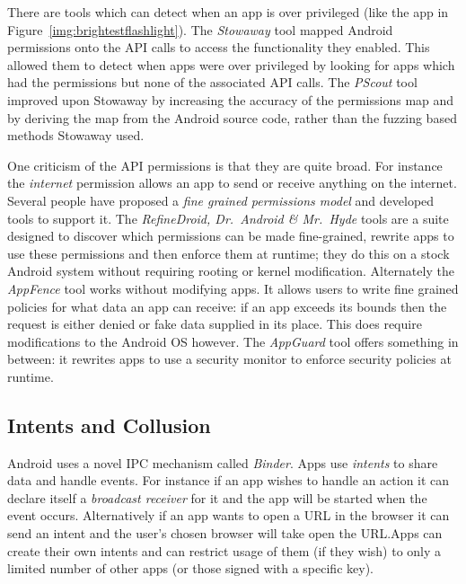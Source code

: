 \documentclass[a4paper,sfsidenotes]{tufte-book}
\begin{document}
There are tools which can detect when an app is over privileged (like the app in
Figure~\ref{img:brightestflashlight}). The
\emph{Stowaway} tool\cite{Felt:2011kj} mapped Android permissions onto the API
calls to access the functionality they enabled. This allowed them to detect
when apps were over privileged by looking for apps which had the permissions but
none of the associated API calls. The \emph{PScout} tool\cite{Au:2012ju}
improved upon Stowaway by increasing the accuracy of the permissions map and by
deriving the map from the Android source code, rather than the fuzzing based
methods Stowaway used.

One criticism of the API permissions is that they are quite broad. For instance
the \emph{internet} permission allows an app to send or receive anything on the
internet. Several people have proposed a \emph{fine grained permissions model}
and developed tools to support it. The \emph{RefineDroid, Dr.~Android \&
  Mr.~Hyde} tools\cite{Jeon:2012ki} are a suite designed to discover which
permissions can be made fine-grained, rewrite apps to use these permissions and
then enforce them at runtime; they do this on a stock Android system without
requiring rooting or kernel modification. Alternately the \emph{AppFence}
tool\cite{Hornyack:2011wq} works without modifying apps. It allows users to
write fine grained policies for what data an app can receive: if an app exceeds
its bounds then the request is either denied or fake data supplied in its place.
This does require modifications to the Android OS however. The \emph{AppGuard}
tool\cite{Backes:2013ec} offers something in between: it rewrites apps to use a
security monitor to enforce security policies at runtime.

\subsection{Intents and Collusion}

Android uses a novel IPC mechanism called \emph{Binder}. Apps use
\emph{intents} to share data and handle events. For instance if an app wishes
to handle an  action it can declare itself a \emph{broadcast
  receiver} for it and the app will be started when the event occurs.
Alternatively if an app wants to open a URL in the browser it can send an
 intent and the user's chosen browser will take open the
URL.\@ Apps can create their own intents and can restrict usage of them (if they
wish) to only a limited number of other apps (or those signed with a specific
key).
\end{document}
